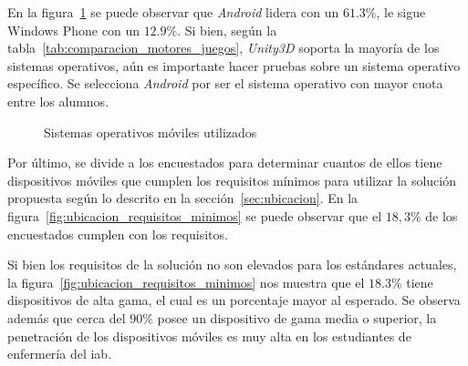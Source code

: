 En la figura~\ref{fig:ubicacion_sistemas_operativos} se puede observar que
\emph{Android} lidera con un $61.3\%$, le sigue Windows Phone con un $12.9\%$.
Si bien, según la tabla~\ref{tab:comparacion_motores_juegos}, \emph{Unity3D}
soporta la mayoría de los sistemas operativos, aún es importante hacer pruebas
sobre un sistema operativo específico. Se selecciona \emph{Android} por ser el
sistema operativo con mayor cuota entre los alumnos.


 \begin{figure}[H]
        \centering
        \caption{Sistemas operativos móviles utilizados}
	    \label{fig:ubicacion_sistemas_operativos}
\end{figure}
    

Por último, se divide a los encuestados para determinar cuantos de ellos
tiene dispositivos móviles que cumplen los requisitos mínimos para utilizar la
solución propuesta según lo descrito en la sección~\ref{sec:ubicacion}. En la
figura~\ref{fig:ubicacion_requisitos_minimos} se puede observar que el $18,3\%$
de los encuestados cumplen con los requisitos.

Si bien los requisitos de la solución no son elevados para los estándares
actuales, la figura~\ref{fig:ubicacion_requisitos_minimos} nos muestra que el
$18.3\%$ tiene dispositivos de alta gama, el cual es un porcentaje mayor al
esperado. Se observa además que cerca del
$90\%$ posee un dispositivo de gama media o superior, la penetración de los
dispositivos móviles es muy alta en los estudiantes de enfermería del \Gls{iab}.


